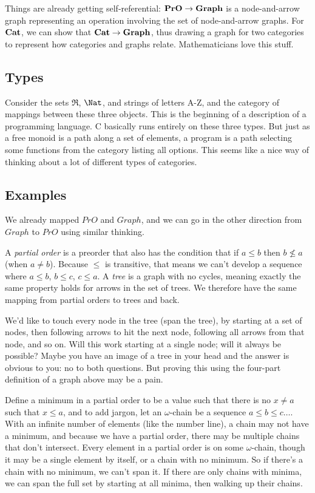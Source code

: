\documentclass[11pt]{article}
\begin{document}
Things are already getting self-referential: ${\bf PrO}\to {\bf Graph}$ is a
node-and-arrow graph representing an operation involving the set of node-and-arrow
graphs. For ${\bf Cat}$, we can show that ${\bf Cat}\to {\bf Graph}$, thus drawing a
graph for two categories to represent how categories and graphs relate.  Mathematicians
love this stuff.

\subsection{Types} Consider the sets $\Re$, $\Nat$, and strings of letters A-Z, and the
category of mappings between these three objects. This is the beginning of a description
of a programming language. C basically runs entirely on these three types. But just as a
free monoid is a path along a set of elements, a program is a path selecting some
functions from the category listing all options. This seems like a nice way of thinking
about a lot of different types of categories.


\subsection{Examples} We already mapped $PrO$ and $Graph$, and we can go in the other
direction from $Graph$ to $PrO$ using similar thinking.

A {\em partial order} is a preorder that also has the condition that if $a\leq b$ then
$b\not\leq a$ (when $a\neq b$). Because $\leq$ is transitive, that means we can't
develop a sequence where $a\leq b$, $b\leq c$, $c\leq a$.
A {\em tree} is a graph with no cycles, meaning exactly the same property holds for arrows
in the set of trees. We therefore have the same mapping from partial orders to trees and
back.

We'd like to touch every node in the tree (span the tree), by starting at a set of
nodes, then following arrows to hit the next node, following all arrows from that node, and so on.
Will this work starting at a single node; will it always be possible? Maybe you have an
image of a tree in your head and the answer is obvious to you: no to both questions.
But proving this using the four-part definition of a graph above may be a pain.

Define a minimum in a partial order to be a value such that there is no $x\neq a$ such that
$x\leq a$, and to add jargon, let an $\omega$-chain be a sequence $a\leq b\leq
c\dots$. With an infinite number of elements (like the number line), a chain may not have
a minimum, and because we have a partial order, there may be multiple chains that don't
intersect. Every element in a partial order is on some $\omega$-chain, though it may be a
single element by itself, or a chain with no minimum. So if there's a chain with no
minimum, we can't span it.  If there are only chains with minima, we can span the full
set by starting at all minima, then walking up their chains.
\end{document}
